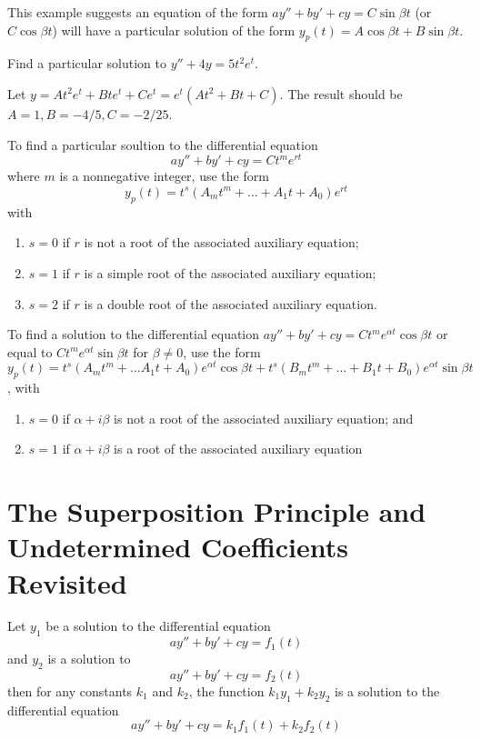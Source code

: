 \documentclass[../diffeq.tex]{subfiles}
\begin{document}
This example suggests an equation of the form $ay''+by'+cy=C\sin\beta t$ (or $C\cos\beta t$) will have a particular solution of the form $y_p(t)=A\cos\beta t+B\sin\beta t$.

\begin{example}
    Find a particular solution to $y''+4y=5t^2e^t$.

    Let $y= At^2e^t+Bte^t+Ce^t = e^t(At^2+Bt+C)$. The result should be $A=1,B=-4/5, C=-2/25$.
\end{example}

To find a particular soultion to the differential equation 
\[ ay''+by'+cy=Ct^me^{rt} \]
where $m$ is a nonnegative integer, use the form 
\[ y_p(t)=t^s(A_mt^m+\dots +A_1t+A_0)e^{rt} \]
with 
\begin{enumerate}
    \item $s=0$ if $r$ is not a root of the associated auxiliary equation;
    \item $s=1$ if $r$ is a simple root of the associated auxiliary equation;
    \item $s=2$ if $r$ is a double root of the associated auxiliary equation.
\end{enumerate}

To find a solution to the differential equation $ay''+by'+cy = Ct^me^{\alpha t}\cos \beta t$ or equal to $Ct^me^{\alpha t}\sin\beta t$ for $\beta \neq 0$, use the form $y_p(t)=t^s(A_mt^m+\dots A_1t+A_0)e^{\alpha t}\cos\beta t+t^s(B_mt^m+\dots +B_1t+B_0)e^{\alpha t}\sin\beta t$, with 
\begin{enumerate}
    \item $s=0$ if $\alpha + i\beta$ is not a root of the associated auxiliary equation; and 
    \item $s=1$ if $\alpha + i\beta$ is a root of the associated auxiliary equation
\end{enumerate}

\section{The Superposition Principle and Undetermined Coefficients Revisited}
\begin{theorem}
    Let $y_1$ be a solution to the differential equation 
    \[ ay''+by'+cy=f_1(t) \]
    and $y_2$ is a solution to 
    \[ ay''+by'+cy=f_2(t) \]
    then for any constants $k_1$ and $k_2$, the function $k_1y_1+k_2y_2$ is a solution to the differential equation 
    \[ ay''+by'+cy = k_1f_1(t)+k_2f_2(t) \]
\end{theorem}
\end{document}
